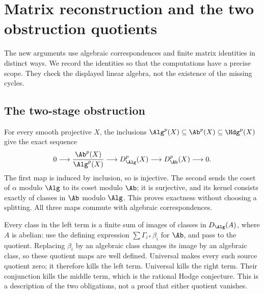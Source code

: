 \section{Matrix reconstruction and the two obstruction quotients}
\label{v7:app:matrix-reconstruction}

The new arguments use algebraic correspondences and finite matrix
identities in distinct ways. We record the identities so that the
computations have a precise scope. They check the displayed linear
algebra, not the existence of the missing cycles.

\subsection{The two-stage obstruction}

For every smooth projective \(X\), the inclusions
\(\Alg^p(X)\subseteq\Ab^p(X)\subseteq\Hdg^p(X)\) give
the exact sequence
\begin{equation}\label{v7:eq:two-stage-exact}
0\longrightarrow\frac{\Ab^p(X)}{\Alg^p(X)}
 \longrightarrow D_{\Alg}^p(X)
 \longrightarrow D_{\Ab}^p(X)\longrightarrow0.
\end{equation}
The first map is induced by inclusion, so is injective. The second
sends the coset of \(\alpha\) modulo \(\Alg\) to its coset modulo
\(\Ab\); it is surjective, and its kernel consists exactly of
classes in \(\Ab\) modulo \(\Alg\). This proves exactness without
choosing a splitting. All three maps commute with algebraic
correspondences.

Every class in the left term is a finite sum of images of classes in
\(D_{\Alg}(A)\), where \(A\) is abelian: use the defining expression
\(\sum\Gamma_{i*}\beta_i\) for \(\Ab\), and pass to the quotient.
Replacing \(\beta_i\) by an algebraic class changes its image by an
algebraic class, so these quotient maps are well defined. Universal
\Fii{} makes every such source quotient zero; it therefore kills
the left term. Universal \Fiii{} kills the right term. Their
conjunction kills the middle term, which is the rational Hodge
conjecture. This is a description of the two obligations, not a
proof that either quotient vanishes.

